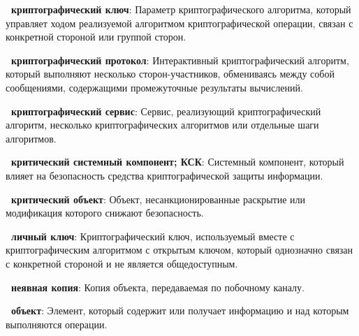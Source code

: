 
{\bf \thedefctr~криптографический ключ}: 
Параметр криптографического алгоритма, который управляет ходом  реализуемой
алгоритмом криптографической операции, связан с конкретной стороной или группой
сторон.



{\bf \thedefctr~криптографический протокол}:
Интерактивный криптографический алгоритм, который выполняют 
несколько сторон-участников, обмениваясь между собой сообщениями,
содержащими промежуточные результаты вычислений. 

{\bf \thedefctr~криптографический сервис}:
Сервис, реализующий криптографический алгоритм, 
несколько криптографических алгоритмов или отдельные шаги алгоритмов.

{\bf \thedefctr~критический системный компонент; КСК}:
Системный компонент, который влияет на безопасность средства криптографической 
защиты информации.


{\bf \thedefctr~критический объект}: 
Объект, несанкционированные раскрытие или модификация которого 
снижают безопасность.

{\bf \thedefctr~личный ключ}:
Криптографический ключ, используемый вместе с криптографическим алгоритмом с
открытым ключом, который однозначно связан с конкретной стороной и не является
общедоступным.

{\bf \thedefctr~неявная копия}:
Копия объекта, передаваемая по побочному каналу.

{\bf \thedefctr~объект}: 
Элемент, который содержит или получает информацию
и над которым выполняются операции.

